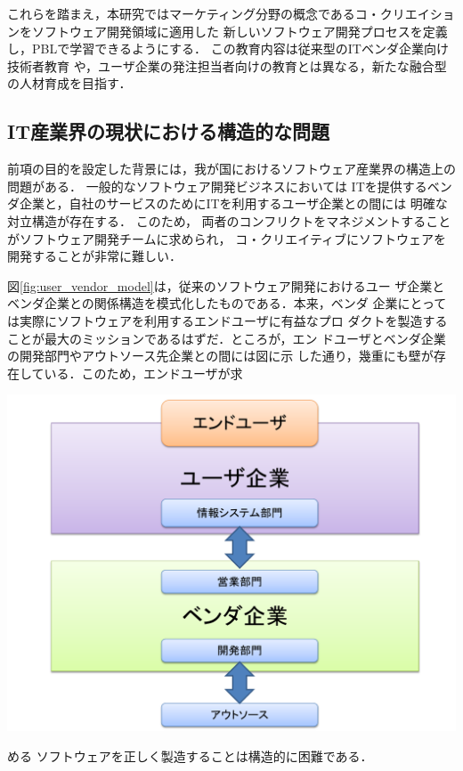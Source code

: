 \documentclass[a4j,9pt,twoside]{jarticle}
\begin{document}
\begin{multicols}{2}
    これらを踏まえ，本研究ではマーケティング分野の概念であるコ・クリエイションをソフトウェア開発領域に適用した
    新しいソフトウェア開発プロセスを定義し，PBLで学習できるようにする．
    この教育内容は従来型のITベンダ企業向け技術者教育
    や，ユーザ企業の発注担当者向けの教育とは異なる，新たな融合型の人材育成を目指す．
	
\subsection{IT産業界の現状における構造的な問題}
    前項の目的を設定した背景には，我が国におけるソフトウェア産業界の構造上の問題がある．
	一般的なソフトウェア開発ビジネスにおいては    
    ITを提供するベンダ企業と，自社のサービスのためにITを利用するユーザ企業との間には
    明確な対立構造が存在する．
    このため，
    両者のコンフリクトをマネジメントすることがソフトウェア開発チームに求められ，
    コ・クリエイティブにソフトウェアを開発することが非常に難しい．
    
    図\ref{fig:user_vendor_model}は，従来のソフトウェア開発におけるユー
    ザ企業とベンダ企業との関係構造を模式化したものである．本来，ベンダ
    企業にとっては実際にソフトウェアを利用するエンドユーザに有益なプロ
    ダクトを製造することが最大のミッションであるはずだ．ところが，エン
    ドユーザとベンダ企業の開発部門やアウトソース先企業との間には図に示
    した通り，幾重にも壁が存在している．このため，エンドユーザが求
\begin{center}
\includegraphics[width=0.8\linewidth]{figs/user_vendor_model.pdf}
\label{fig:user_vendor_model}
\end{center}
    める
    ソフトウェアを正しく製造することは構造的に困難である．
    

\end{multicols}
\end{document}
